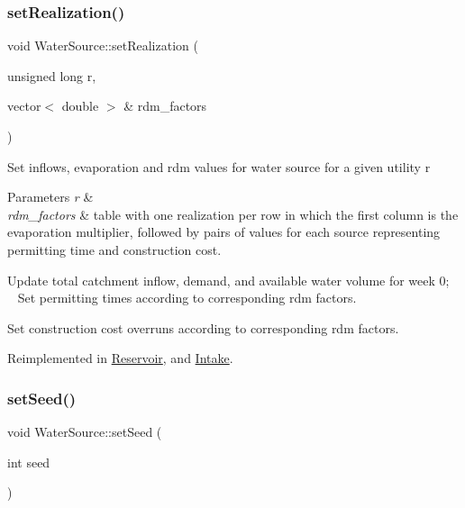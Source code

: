 \subsubsection{\texorpdfstring{set\+Realization()}{setRealization()}}
{\footnotesize\ttfamily void Water\+Source\+::set\+Realization (\begin{DoxyParamCaption}\item[{unsigned long}]{r,  }\item[{vector$<$ double $>$ \&}]{rdm\+\_\+factors }\end{DoxyParamCaption})\hspace{0.3cm}{\ttfamily [virtual]}}

Set inflows, evaporation and rdm values for water source for a given utility r 
\begin{DoxyParams}{Parameters}
{\em r} & \\
\hline
{\em rdm\+\_\+factors} & table with one realization per row in which the first column is the evaporation multiplier, followed by pairs of values for each source representing permitting time and construction cost. \\
\hline
\end{DoxyParams}
Update total catchment inflow, demand, and available water volume for week 0; ~\newline
~\newline
 Set permitting times according to corresponding rdm factors.

Set construction cost overruns according to corresponding rdm factors. 

Reimplemented in \mbox{\hyperlink{classReservoir_ad1bb7aa46397719d09e0b6188b9bc28d_ad1bb7aa46397719d09e0b6188b9bc28d}{Reservoir}}, and \mbox{\hyperlink{classIntake_a879c4c780a4d21606e848f57464cf3b6_a879c4c780a4d21606e848f57464cf3b6}{Intake}}.

\mbox{\label{classWaterSource_a741c60afc9dafaae318ce7c99f4fd327_a741c60afc9dafaae318ce7c99f4fd327}} 
\subsubsection{\texorpdfstring{set\+Seed()}{setSeed()}}
{\footnotesize\ttfamily void Water\+Source\+::set\+Seed (\begin{DoxyParamCaption}\item[{int}]{seed }\end{DoxyParamCaption})\hspace{0.3cm}{\ttfamily [static]}}


